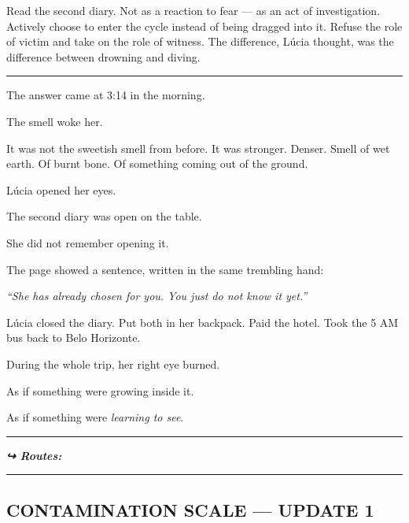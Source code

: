 \noindent Read the second diary. Not as a reaction to fear --- as an act of investigation. Actively choose to enter the cycle instead of being dragged into it. Refuse the role of victim and take on the role of witness. The difference, Lúcia thought, was the difference between drowning and diving.

\vspace{0.5em}\noindent\rule{\textwidth}{0.5pt}\vspace{0.5em}

\noindent The answer came at 3:14 in the morning.

\noindent The smell woke her.

\noindent It was not the sweetish smell from before. It was stronger. Denser. Smell of wet earth. Of burnt bone. Of something coming out of the ground.

\noindent Lúcia opened her eyes.

\noindent The second diary was open on the table.

\noindent She did not remember opening it.

\noindent The page showed a sentence, written in the same trembling hand:

\noindent \textit{\textquotedblleft{}She has already chosen for you. You just do not know it yet.\textquotedblright{}}

\noindent Lúcia closed the diary. Put both in her backpack. Paid the hotel. Took the 5 AM bus back to Belo Horizonte.

\noindent During the whole trip, her right eye burned.

\noindent As if something were growing inside it.

\noindent As if something were \textit{learning to see}.

\vspace{0.5em}\noindent\rule{\textwidth}{0.5pt}\vspace{0.5em}

\vspace{0.5em}
\noindent\textit{\textbf{↪ Routes:}  \rotasep {}}

\vspace{0.5em}\noindent\rule{\textwidth}{0.5pt}\vspace{0.5em}

\subsection*{CONTAMINATION SCALE --- UPDATE 1}

